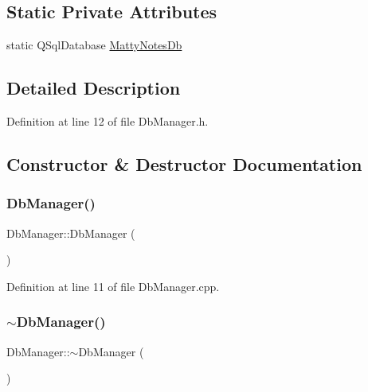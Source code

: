 \subsection*{Static Private Attributes}
\begin{DoxyCompactItemize}
\item 
static Q\+Sql\+Database \hyperlink{classDbManager_a3f6052f559a7a72eef66848ebc9f3eaa}{Matty\+Notes\+Db}
\end{DoxyCompactItemize}


\subsection{Detailed Description}


Definition at line 12 of file Db\+Manager.\+h.



\subsection{Constructor \& Destructor Documentation}
\hypertarget{classDbManager_a0d16cf5bba931362e6c581eb1b5ba66a}{}\label{classDbManager_a0d16cf5bba931362e6c581eb1b5ba66a} 
\subsubsection{\texorpdfstring{Db\+Manager()}{DbManager()}}
{\footnotesize\ttfamily Db\+Manager\+::\+Db\+Manager (\begin{DoxyParamCaption}{ }\end{DoxyParamCaption})}



Definition at line 11 of file Db\+Manager.\+cpp.

\hypertarget{classDbManager_ac5cdf8e5e932d1681ab807d8f256374c}{}\label{classDbManager_ac5cdf8e5e932d1681ab807d8f256374c} 
\subsubsection{\texorpdfstring{$\sim$\+Db\+Manager()}{~DbManager()}}
{\footnotesize\ttfamily Db\+Manager\+::$\sim$\+Db\+Manager (\begin{DoxyParamCaption}{ }\end{DoxyParamCaption})}



